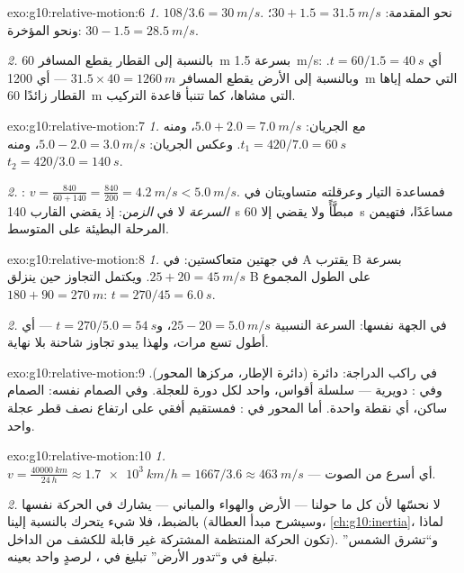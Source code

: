 \begin{solution}{exo:g10:relative-motion:6}
\emph{1.} $108/3.6 = \qty{30}{m/s}$. نحو المقدمة:
$30 + 1.5 = \qty{31.5}{m/s}$؛ ونحو المؤخرة:
$30 - 1.5 = \qty{28.5}{m/s}$.

\emph{2.} بالنسبة إلى القطار يقطع المسافر \qty{60}{m} بسرعة
\qty{1.5}{m/s}: أي $t = 60/1.5 = \qty{40}{s}$. وبالنسبة إلى الأرض يقطع
المسافر $31.5 \times 40 = \qty{1260}{m}$ --- أي \qty{1200}{m}
التي حمله إياها القطار زائدًا \qty{60}{m} التي مشاها، كما تتنبأ قاعدة
التركيب.
\end{solution}

\begin{solution}{exo:g10:relative-motion:7}
\emph{1.} مع الجريان: $5.0 + 2.0 = \qty{7.0}{m/s}$، ومنه
$t_1 = 420/7.0 = \qty{60}{s}$. وعكس الجريان: $5.0 - 2.0 = \qty{3.0}{m/s}$،
ومنه $t_2 = 420/3.0 = \qty{140}{s}$.

\emph{2.} : $v = \frac{840}{60 + 140}
= \frac{840}{200} = \qty{4.2}{m/s} < \qty{5.0}{m/s}$. فمساعدة التيار
وعرقلته متساويتان في \emph{السرعة} لا في \emph{الزمن}:
إذ يقضي القارب \qty{140}{s} مبطَّأً ولا يقضي إلا \qty{60}{s}
مساعَدًا، فتهيمن المرحلة البطيئة على المتوسط.
\end{solution}

\begin{solution}{exo:g10:relative-motion:8}
\emph{1.} في جهتين متعاكستين: في  A يقترب B بسرعة
$25 + 20 = \qty{45}{m/s}$. ويكتمل التجاوز حين ينزلق B
على الطول المجموع $180 + 90 = \qty{270}{m}$:
$t = 270/45 = \qty{6.0}{s}$.

\emph{2.} في الجهة نفسها: السرعة النسبية $25 - 20 = \qty{5.0}{m/s}$،
و$t = 270/5.0 = \qty{54}{s}$ --- أي أطول تسع مرات، ولهذا يبدو
تجاوز شاحنة بلا نهاية.
\end{solution}

\begin{solution}{exo:g10:relative-motion:9}
في  راكب الدراجة: دائرة (دائرة الإطار، مركزها المحور).
وفي : دويرية --- سلسلة أقواس، واحد لكل دورة
للعجلة. وفي  الصمام نفسه: الصمام ساكن، أي نقطة واحدة.
أما المحور في : فمستقيم أفقي على ارتفاع
نصف قطر عجلة واحد.
\end{solution}

\begin{solution}{exo:g10:relative-motion:10}
\emph{1.} $v = \frac{\qty{40000}{km}}{\qty{24}{h}}
\approx \qty{1.7e3}{km/h} = 1667/3.6 \approx \qty{463}{m/s}$ ---
أي أسرع من الصوت.

\emph{2.} لا نحسّها لأن كل ما حولنا --- الأرض
والهواء والمباني --- يشارك في الحركة نفسها بالضبط، فلا شيء يتحرك
بالنسبة إلينا (وسيشرح مبدأ العطالة،
\cref{ch:g10:inertia}، لماذا تكون الحركة المنتظمة المشتركة
غير قابلة للكشف من الداخل). و``تشرق الشمس'' تبليغ في 
و``تدور الأرض'' تبليغ في ، لرصدٍ
واحد بعينه.
\end{solution}

